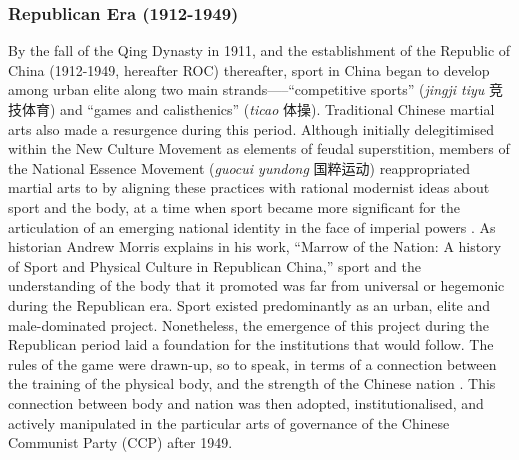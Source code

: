     \subsubsection{Republican Era (1912-1949)}
    By the fall of the Qing Dynasty in 1911, and the establishment of the Republic of China (1912-1949, hereafter ROC) thereafter, sport in China began to develop among urban elite along two main strands—--``competitive sports'' (\textit{jingji tiyu} 竞技体育) and ``games and calisthenics'' (\textit{ticao} 体操).  Traditional Chinese martial arts also made a resurgence during this period.  Although initially delegitimised within the New Culture Movement as elements of feudal superstition, members of the National Essence Movement (\textit{guocui yundong} 国粹运动) reappropriated martial arts to by aligning these practices with rational modernist ideas about sport and the body, at a time when sport became more significant for the articulation of an emerging national identity in the face of imperial powers \citep[38]{Brownell1995}\citep[45]{Morris2004}.  As historian Andrew Morris explains in his work, ``Marrow of the Nation: A history of Sport and Physical Culture in Republican China,'' sport and the understanding of the body that it promoted was far from universal or hegemonic during the Republican era.  Sport existed predominantly as an urban, elite and male-dominated project.  Nonetheless, the emergence of this project during the Republican period laid a foundation for the institutions that would follow.  The rules of the game were drawn-up, so to speak, in terms of a connection between the training of the physical body, and the strength of the Chinese nation \citep[140]{Morris2004}.  This connection between body and nation was then adopted, institutionalised, and actively manipulated in the particular arts of governance of the Chinese Communist Party (CCP) after 1949.

